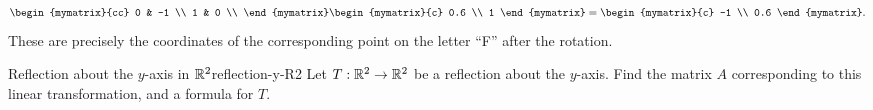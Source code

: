 \begin{solution}
\begin{equation*}
\begin{mymatrix}{cc}
      0 & -1 \\
      1 & 0 \\
    \end{mymatrix}
    \begin{mymatrix}{c} 0.6 \\ 1 \end{mymatrix}
    = \begin{mymatrix}{c} -1 \\ 0.6 \end{mymatrix}.
  \end{equation*}
  These are precisely the coordinates of the corresponding point on
  the letter ``F'' after the rotation.
\end{solution}

\begin{example}{Reflection about the $y$-axis in $\mathbb{R}^2$}{reflection-y-R2}
  Let $T:\mathbb{R}^2\to\mathbb{R}^2$ be a reflection about the $y$-axis. Find the
  matrix%
   $A$ corresponding to this linear
  transformation, and a formula for $T$.
\end{example}

